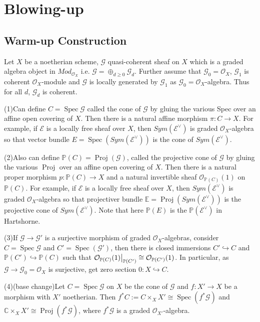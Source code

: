 \documentclass{ctexart}
\newcommand{\spec}{\operatorname{Spec}}
\newcommand{\proj}{\operatorname{Proj}}
\begin{document}
\section{Blowing-up}
\label{section:Blowing-up}

\subsection{Warm-up Construction}
Let $X$ be a noetherian scheme, $\mathcal{G}$ quasi-coherent sheaf on $X$ which is a graded algebra object in $Mod_{\mathcal{O}_{X}}$ i.e. $\mathcal{G} = \oplus_{d \ge 0} \mathcal{G}_{d}$.
Further assume that $\mathcal{G}_{0} = \mathcal{O}_{X}$, $\mathcal{G}_{1}$ is coherent $\mathcal{O}_{X}$-module and $\mathcal{G}$ is locally generated by $\mathcal{G}_{1}$ as $\mathcal{G}_{0} = \mathcal{O}_{X}$-algebra.
Thus for all $d$, $\mathcal{G}_{d}$ is coherent.
\par
(1)Can define $C = \spec\mathcal{G}$ called the cone of $\mathcal{G}$ by gluing the various Spec over an affine open covering of $X$.
Then there is a natural affine morphism $\pi: C \longrightarrow X$.
For example, if $\mathcal{E}$ is a locally free sheaf over $X$, then $Sym(\mathcal{E}^{\lor})$ is graded $\mathcal{O}_{X}$-algebra so that vector bundle $E = \spec(Sym(\mathcal{E}^{\lor}))$ is the cone of $Sym(\mathcal{E}^{\lor})$.
\par
(2)Also can define $\mathbb{P}(C) = \proj(\mathcal{G})$, called the projective cone of $\mathcal{G}$ by gluing the various $\proj$ over an affine open covering of $X$.
Then there is a natural proper morphism $p: \mathbb{P}(C) \longrightarrow X$ and a natural invertible sheaf $\mathcal{O}_{\mathbb{P}(C)}(1)$ on $\mathbb{P}(C)$.
For example, if $\mathcal{E}$ is a locally free sheaf over $X$, then $Sym(\mathcal{E}^{\lor})$ is graded $\mathcal{O}_{X}$-algebra so that projectiver bundle $\mathbb{E} = \proj(Sym(\mathcal{E}^{\lor}))$ is the projective cone of $Sym(\mathcal{E}^{\lor})$.
Note that here $\mathbb{P}(E)$ is the $\mathbb{P}(\mathcal{E}^{\lor})$ in Hartshorne.
\par
(3)If $\mathcal{G} \longrightarrow \mathcal{G}'$ is a surjective morphism of graded $\mathcal{O}_{X}$-algebras,
consider $C = \spec\mathcal{G}$ and $C' = \spec(\mathcal{G}')$, then there is closed immersions $C' \hookrightarrow C$ and $\mathbb{P}(C') \hookrightarrow \mathbb{P}(C)$ such that $\mathcal{O}_{\mathbb{P}(C)}(1)\big{|}_{\mathbb{P}(C')} \cong \mathcal{O}_{\mathbb{P}(C')}(1)$.
In particular, as $\mathcal{G} \longrightarrow \mathcal{G}_{0} = \mathcal{O}_{X}$ is surjective, get zero section $0: X \hookrightarrow C$.
\par
(4)(base change)Let $C = \spec\mathcal{G}$ on $X$ be the cone of $\mathcal{G}$ and $f: X' \longrightarrow X$ be a morphism with $X'$ noetherian.
Then $f^{\ast}C := C \times_{X} X' \cong \spec(f^{\ast}\mathcal{G})$ and $\mathbb{C} \times_{X} X' \cong \proj(f^{\ast}\mathcal{G})$, where $f^{\ast}\mathcal{G}$ is a graded $\mathcal{O}_{X'}$-algebra.
\end{document}
